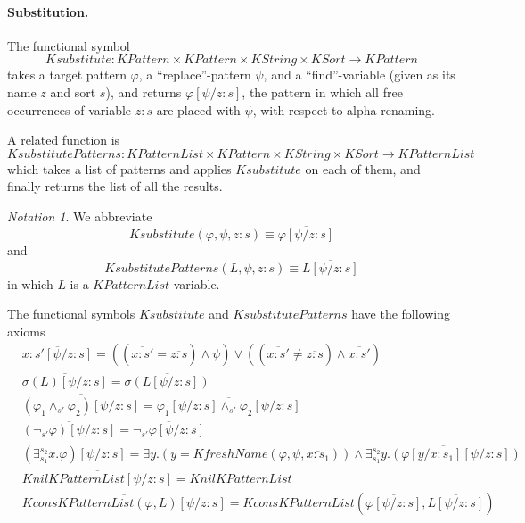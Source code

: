 \documentclass[UTF8,11pt]{article}
\newcounter{thmcounter}
\theoremstyle{plain}
\theoremstyle{definition}
\theoremstyle{remark}
\newtheorem{notation}   [thmcounter]{Notation}
\newcommand{\cln}{{:}}
\newcommand{\KString}{\mathit{KString}}
\newcommand{\KSort}{\mathit{KSort}}
\newcommand{\KPatternList}{\mathit{KPatternList}}
\newcommand{\KnilKPatternList}{\mathit{KnilKPatternList}}
\newcommand{\KconsKPatternList}{\mathit{KconsKPatternList}}
\newcommand{\KPattern}{\mathit{KPattern}}
\newcommand{\KfreshName}{\mathit{KfreshName}}
\newcommand{\Ksubstitute}{\mathit{Ksubstitute}}
\newcommand{\KsubstitutePatterns}{\mathit{KsubstitutePatterns}}
\begin{document}
\paragraph{Substitution.}
The functional symbol
$$\Ksubstitute \colon \KPattern \times \KPattern \times \KString \times \KSort \to \KPattern$$
takes a target pattern $\varphi$, a ``replace''-pattern $\psi$, and a ``find''-variable (given as its name $z$ and sort $s$), and returns $\varphi[\psi / z \cln s]$, the pattern in which all free occurrences of variable ${z \cln s}$ are placed with $\psi$, with respect to alpha-renaming.

A related function is 
$$\KsubstitutePatterns \colon \KPatternList \times \KPattern \times \KString \times \KSort \to \KPatternList$$
which takes a list of patterns and applies $\Ksubstitute$ on each of them, and finally returns the list of all the results.

\begin{notation}
	We abbreviate 
	$$\Ksubstitute(\varphi, \psi, z \cln s) \equiv \overline{\varphi[\psi / z \cln s]}$$
	and 
	$$\KsubstitutePatterns(L, \psi, z \cln s) \equiv \overline{L[\psi / z \cln s]}$$
	in which $L$ is a $\KPatternList$ variable.
\end{notation}

The functional symbols $\Ksubstitute$ and $\KsubstitutePatterns$ have the following axioms
\begin{align*}
  & \overline{x \cln s' [\psi / z \cln s]} = ((\overline{x \cln s'} = \overline{z \cln s}) \wedge \psi) \vee ((\overline{x \cln s'} \neq \overline{z \cln s}) \wedge \overline{x \cln s'})
  \\
  & \overline{\sigma(L) [\psi / z \cln s]} = \overline{\sigma(L[\psi / z \cln s])}
  \\
  & \overline{(\varphi_1 \wedge_{s'} \varphi_2) [\psi / z \cln s]} = \overline{\varphi_1[\psi / z \cln s] \wedge_{s'} \varphi_2[\psi / z \cln s]}
  \\
  & \overline{(\neg_{s'} \varphi)[\psi / z \cln s]} = \overline{\neg_{s'} \varphi[\psi / z \cln s]}
  \\
  & \overline{(\exists_{s_1}^{s_2}x . \varphi)[\psi/z \cln s]} = \exists y . (y = \KfreshName(\varphi, \psi, \overline{x \cln s_1})) \wedge \overline{\exists_{s_1}^{s_2} y . (\varphi[y/x \cln s_1][\psi/z \cln s])}
  \\
  & \overline{\KnilKPatternList[\psi / z \cln s]} = \KnilKPatternList
  \\
  & \overline{\KconsKPatternList(\varphi, L)[\psi / z \cln s]} = \KconsKPatternList(\overline{\varphi[\psi / z \cln s]}, \overline{L[\psi / z \cln s]})
\end{align*}
\end{document}
